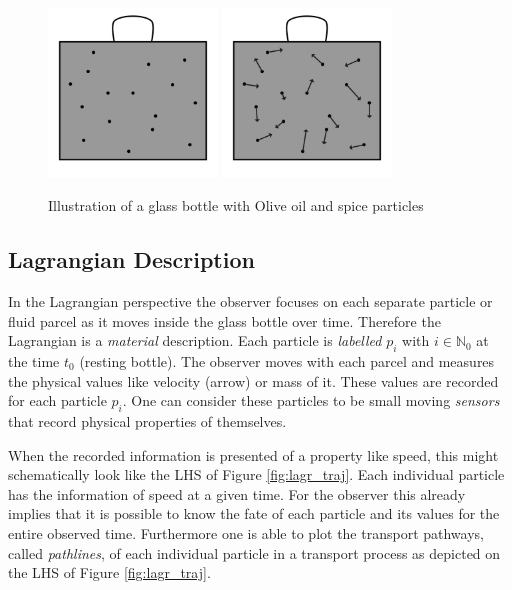 \begin{figure}[htb]
\centering
\includegraphics[width=0.4\textwidth]{Figures/olive_oil_can_01.pdf}
\includegraphics[width=0.4\textwidth]{Figures/olive_oil_can_lagran.pdf}
\caption{Illustration of a glass bottle with Olive oil and spice particles}
\label{fig:Olive_bottle_plain}
\end{figure}

\subsection{Lagrangian Description}
\label{sec:lagrangian_descr}
In the Lagrangian perspective the observer focuses on each separate particle or fluid parcel as it moves inside the glass bottle over time. Therefore the Lagrangian is a \emph{material} description. Each particle is \emph{labelled} $p_{i}$ with $i \in \mathbb{N}_{0}$ at the time $t_{0}$ (resting bottle). The observer moves with each parcel and measures the physical values like velocity (arrow) or mass of it. These values are recorded for each particle $p_{i}$. One can consider these particles to be small moving \emph{sensors} that record physical properties of themselves. 

When the recorded information is presented of a property like speed, this might schematically look like the LHS of Figure \ref{fig:lagr_traj}. Each individual particle has the information of speed at a given time. For the observer this already implies that it is possible to know the fate of each particle and its values for the entire observed time. Furthermore one is able to plot the transport pathways, called \emph{pathlines}, of each individual particle in a transport process as depicted on the LHS of Figure \ref{fig:lagr_traj}.

